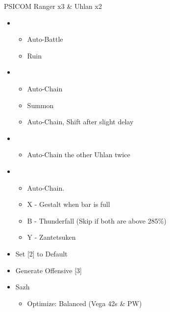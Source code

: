 	\begin{battle}[0:35]{PSICOM Ranger x3 \& Uhlan x2}
		\begin{itemize}
			\item \second
			      \begin{itemize}
				      \item Auto-Battle
				      \item Ruin
			      \end{itemize}
			\item \fourth
			      \begin{itemize}
				      \item Auto-Chain
				      \item Summon
				      \item Auto-Chain, Shift after slight delay
			      \end{itemize}
			\item \fifth
			      \begin{itemize}
				      \item Auto-Chain the other Uhlan twice
			      \end{itemize}
			\item \fourth
			      \begin{itemize}
				      \item Auto-Chain.
				      \item X - Gestalt when bar is full
				      \item B - Thunderfall (Skip if both are above 285\%)
				      \item Y - Zantetsuken
			      \end{itemize}
		\end{itemize}
		 
	\end{battle}



	\begin{menu}
		\begin{itemize}
			\paradigm
			\begin{itemize}
				\item Set [2] to Default
				\item Generate Offensive [3]
			\end{itemize}
			\equip
			\begin{itemize}
				\item Sazh
				      \begin{itemize}
					      \item Optimize: Balanced (Vega 42s \& PW)
				      \end{itemize}
			\end{itemize}
		\end{itemize}
	\end{menu}
	\vfill

